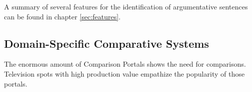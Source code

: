 A summary of several features for the identification of argumentative sentences can be found in chapter \ref{sec:features}.


%
%
%
%



\subsection{Domain-Specific Comparative Systems}
The enormous amount of Comparison Portals shows the need for comparisons. Television spots with high production value empathize the popularity of those portals.

